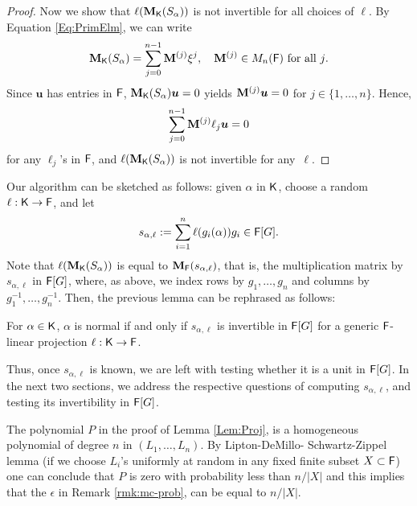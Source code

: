 \begin{proof}
  Now we show that $\ell(\mat M_\K(S_\alpha))$ is not invertible for all
  choices of $\ell$. By Equation \eqref{Eq:PrimElm}, we can write
  $$\mat M_\K(S_\alpha) = \sum_{j = 0}^{n-1} \mat M^{(j)} \xbar^j, \quad 
  \mat M^{(j)} \in M_{n}(\F) \text{~for all $j$}.$$ 
  Since $\boldsymbol{u}$ has entries in ${\mathsf{F}}$,
  $\mat M_\K(S_\alpha) \boldsymbol{u} =0$ yields
  $\mat M^{(j)}\boldsymbol{u} = 0$ for
  $j \in \lbrace 1, \ldots , n \rbrace$. Hence,
$$\sum_{j = 0}^{n-1} \mat M^{(j)} \ell_j \boldsymbol{u} = 0$$ for any 
$\ell_j$'s in ${\mathsf{F}}$, and $\ell(\mat M_\K(S_\alpha))$ is not invertible for any~$\ell$.
\end{proof} 
Our algorithm can be sketched as follows: given $\alpha$ in ${\mathsf{K}}$,
choose a random $\ell: {\mathsf{K}}\to{\mathsf{F}}$, and let
\begin{equation}\label{def:s_alpha_ell}
s_{\alpha,\ell}:=\sum_{i=1}^n \ell(g_i(\alpha))g_i \in {\mathsf{F}}[G].
\end{equation}
Note that $\ell(\mat M_\K(S_\alpha))$ is equal to $\mat
M_\F(s_{\alpha,\ell})$, that is, the multiplication matrix by
$s_{\alpha,\ell}$ in ${\mathsf{F}}[G]$, where, as above, we index rows by
$g_1,\dots,g_n$ and columns by $g_1^{-1},\dots,g_n^{-1}$.  Then,
the previous lemma can be rephrased as follows:
\begin{lemma}
  \label{Lem:Proj-bis}
  For $\alpha \in {\mathsf{K}}$, $\alpha$ is normal if and only if
  $s_{\alpha,\ell}$ is invertible in ${\mathsf{F}}[G]$ for a generic
  ${\mathsf{F}}$-linear projection $\ell: {\mathsf{K}} \to {\mathsf{F}}$.
\end{lemma}
Thus, once $s_{\alpha,\ell}$ is known, we are left with testing
whether it is a unit in ${\mathsf{F}}[G]$. In the next two sections, we address
the respective questions of computing $s_{\alpha,\ell}$, and testing
its invertibility in ${\mathsf{F}}[G]$.
\begin{remark}\label{rmk:mc-epsilon}
The polynomial $P$ in the proof of Lemma \ref{Lem:Proj}, is a homogeneous 
polynomial of degree $n$ in $(L_1, \ldots , L_n)$. By Lipton-DeMillo-
Schwartz-Zippel lemma (if we choose $L_i$'s uniformly at random in any 
fixed finite subset $X \subset {\mathsf{F}}$) one can conclude that $P$ is zero with 
probability less than $n/|X|$ and this implies that the $\epsilon$ in Remark \ref{rmk:mc-prob}, can be equal to $n/|X|$.
\end{remark}





